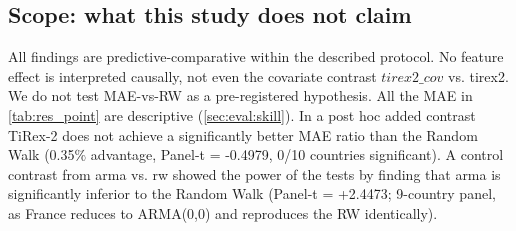 \subsection{Scope: what this study does not claim}
\label{sec:lim:scope}
%
All findings are predictive-comparative within the described protocol. No feature effect is interpreted causally, not even the covariate contrast $tirex2\_cov$ vs. tirex2.
%
We do not test MAE-vs-RW as a pre-registered hypothesis. All the MAE in \cref{tab:res_point} are descriptive (\cref{sec:eval:skill}). In a post hoc added contrast TiRex-2 does not achieve a significantly better MAE ratio than the Random Walk (0.35$\%$ advantage, Panel-t = -0.4979, 0/10 countries significant). A control contrast from arma vs. rw showed the power of the tests by finding that arma is significantly inferior to the Random Walk (Panel-t = +2.4473; 9-country panel, as France reduces to ARMA(0,0) and reproduces the RW identically).
